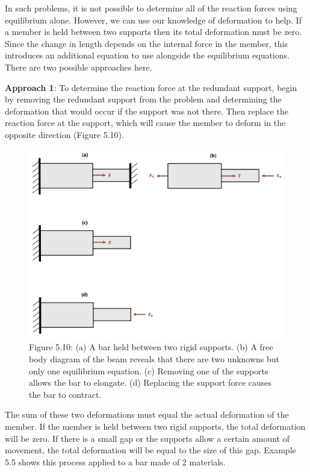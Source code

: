 \documentclass[
  letterpaper,
  DIV=11,
  numbers=noendperiod]{scrreprt}
\begin{document}
In such problems, it is not possible to determine all of the reaction
forces using equilibrium alone. However, we can use our knowledge of
deformation to help. If a member is held between two supports then its
total deformation must be zero. Since the change in length depends on
the internal force in the member, this introduces an additional equation
to use alongside the equilibrium equations. There are two possible
approaches here.

\textbf{Approach 1}: To determine the reaction force at the redundant
support, begin by removing the redundant support from the problem and
determining the deformation that would occur if the support was not
there. Then replace the reaction force at the support, which will cause
the member to deform in the opposite direction (Figure 5.10).

\begin{figure}[H]

{\centering \includegraphics[width=5.40625in,height=\textheight]{images/PNGs/Figure 5.11.png}

}

\caption{Figure 5.10: (a) A bar held between two rigid supports. (b) A
free body diagram of the beam reveals that there are two unknowns but
only one equilibrium equation. (c) Removing one of the supports allows
the bar to elongate. (d) Replacing the support force causes the bar to
contract.}

\end{figure}%

The sum of these two deformations must equal the actual deformation of
the member. If the member is held between two rigid supports, the total
deformation will be zero. If there is a small gap or the supports allow
a certain amount of movement, the total deformation will be equal to the
size of this gap. Example 5.5 shows this process applied to a bar made
of 2 materials.
\end{document}
